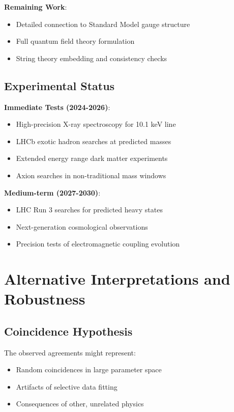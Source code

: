\documentclass[12pt,a4paper]{article}
\begin{document}
\textbf{Remaining Work}:
\begin{itemize}
\item Detailed connection to Standard Model gauge structure
\item Full quantum field theory formulation
\item String theory embedding and consistency checks
\end{itemize}

\subsection{Experimental Status}

\textbf{Immediate Tests (2024-2026)}:
\begin{itemize}
\item High-precision X-ray spectroscopy for 10.1 keV line
\item LHCb exotic hadron searches at predicted masses
\item Extended energy range dark matter experiments
\item Axion searches in non-traditional mass windows
\end{itemize}

\textbf{Medium-term (2027-2030)}:
\begin{itemize}
\item LHC Run 3 searches for predicted heavy states
\item Next-generation cosmological observations
\item Precision tests of electromagnetic coupling evolution
\end{itemize}

\section{Alternative Interpretations and Robustness}

\subsection{Coincidence Hypothesis}

The observed agreements might represent:
\begin{itemize}
\item Random coincidences in large parameter space
\item Artifacts of selective data fitting  
\item Consequences of other, unrelated physics
\end{itemize}
\end{document}
